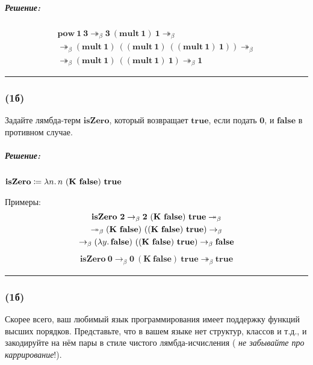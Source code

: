 \documentclass{article}
\newenvironment{proof}{\subparagraph{\hspace{-1em}Решение:\newline}\-}{\par\noindent\rule{\textwidth}{0.4pt}}
\newcommand{\comb}[1]{\mathbf{#1}}
\newcommand{\term}[1]{\mathbf{#1}}
\newcommand{\betastep}{\rightarrow_\beta}
\newcommand{\betasteps}{\twoheadrightarrow_\beta}
\renewcommand{\emph}[1]{{\color{blue} \textit{#1}}}
\begin{document}
\begin{proof}
        \begin{gather}
            \term{pow}~\term{1}~\term{3} \betasteps \term{3}~(\term{mult}~\term{1})~\term{1} \betasteps \\
            \betasteps (\term{mult}~\term{1})~((\term{mult}~\term{1})~((\term{mult}~\term{1})~\term{1})) \betasteps \\
            \betasteps (\term{mult}~\term{1})~((\term{mult}~\term{1})~\term{1}) \betasteps \term{1}
        \end{gather}
    \end{proof}

    \subsubsection{(1б)}

    Задайте лямбда-терм $\term{isZero}$, который возвращает $\term{true}$, если подать $\term{0}$, и $\term{false}$ в противном случае.

    \begin{proof}
        \(\textbf{isZero} \coloneqq \lambda n\ldotp n~(\comb{K}~\term{false})~\term{true}\)

        Примеры:
        \begin{gather}
            \term{isZero}~\term{2} \betastep \term{2}~(\comb{K}~\term{false})~\term{true} \betasteps \\
            \betasteps (\comb{K}~\term{false})~((\comb{K}~\term{false})~\term{true}) \betastep \\
            \betastep (\lambda y\ldotp \term{false})~((\comb{K}~\term{false})~\term{true}) \betastep \term{false}
        \end{gather}
        \begin{gather}
            \term{isZero}~\term{0} \betastep \term{0}~(\comb{K}~\term{false})~\term{true} \betasteps \term{true}
        \end{gather}
    \end{proof}

    \subsubsection{(1б)}

    Скорее всего, ваш любимый язык программирования имеет поддержку функций высших порядков.
    Представьте, что в вашем языке нет структур, классов и т.д., и закодируйте на нём пары в стиле чистого лямбда-исчисления (\emph{не забывайте про каррирование}!).
\end{document}
